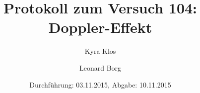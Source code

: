 
\title{Protokoll zum Versuch 104:\\ Doppler-Effekt}
\author{Kyra Klos \and Leonard Borg}
\date{Durchführung: 03.11.2015, Abgabe: 10.11.2015}

  \maketitle
  \setcounter{tocdepth}{1}
  \tableofcontents
  \newpage
  
  
  
  


 
